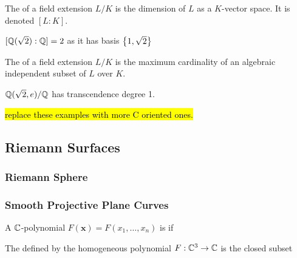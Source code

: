 \documentclass{article}
\begin{document}
\begin{definition}
	The  of a field extension $L/K$ is the dimension of $L$ as a $K$-vector space. It is denoted $[L:K]$.
\end{definition}

\begin{example}
	$[\mathbb{Q}(\sqrt{2}):\mathbb{Q}] = 2$ as it has basis $\left\{ 1,\sqrt{2} \right\}$
\end{example}

\begin{definition}
	The  of a field extension $L/K$ is the maximum cardinality of an algebraic independent subset of $L$ over $K$. 
\end{definition}

\begin{example}
	$\mathbb{Q}(\sqrt{2},e)/\mathbb{Q}$ has transcendence degree 1.
\end{example}

\hl{replace these examples with more C oriented ones. }


\subsection{Riemann Surfaces}

\subsubsection{Riemann Sphere}

\subsubsection{Smooth Projective Plane Curves}

\begin{definition}
	A $\mathbb{C}$-polynomial $F(\bm{x})=F(x_1, \dots, x_n)$ is  if 
\end{definition}

\begin{definition}
	The  defined by the homogeneous polynomial $F:\mathbb{C}^3 \to \mathbb{C}$ is the closed subset
\end{definition}
\end{document}
